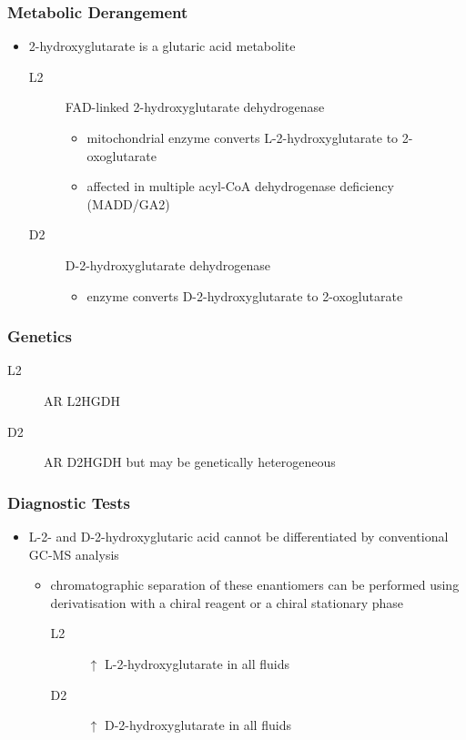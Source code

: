 \documentclass[12pt]{scrartcl}
\begin{document}
\begin{center}
\begin{center}
\subsubsection{Metabolic Derangement}
\label{sec:org2b85f45}
\begin{itemize}
\item 2-hydroxyglutarate is a glutaric acid metabolite 
\begin{description}
\item[{L2}] FAD-linked 2-hydroxyglutarate dehydrogenase
\begin{itemize}
\item mitochondrial enzyme converts L-2-hydroxyglutarate to
2-oxoglutarate
\item affected in multiple acyl-CoA dehydrogenase deficiency (MADD/GA2)
\end{itemize}
\item[{D2}] D-2-hydroxyglutarate dehydrogenase
\begin{itemize}
\item enzyme converts D-2-hydroxyglutarate to 2-oxoglutarate
\end{itemize}
\end{description}
\end{itemize}

\subsubsection{Genetics}
\label{sec:org9be289f}
\begin{description}
\item[{L2}] AR L2HGDH
\item[{D2}] AR D2HGDH but may be genetically heterogeneous
\end{description}

\subsubsection{Diagnostic Tests}
\label{sec:org2ef5aac}
\begin{itemize}
\item L-2- and D-2-hydroxyglutaric acid cannot be differentiated by
conventional GC-MS analysis
\begin{itemize}
\item chromatographic separation of these enantiomers can be performed
using derivatisation with a chiral reagent or a chiral stationary
phase
\begin{description}
\item[{L2}] \(\uparrow\) L-2-hydroxyglutarate in all fluids
\item[{D2}] \(\uparrow\) D-2-hydroxyglutarate in all fluids
\end{description}
\end{itemize}
\end{itemize}


\end{center}
\end{center}
\end{document}
